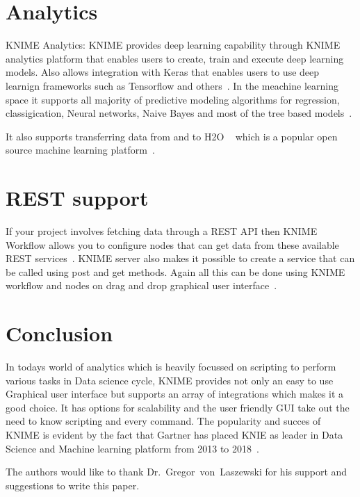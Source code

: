 \section{Analytics}
KNIME Analytics: KNIME provides deep learning capability through KNIME
analytics platform that enables users to create, train and execute
deep learning models. Also allows integration with Keras that enables
users to use deep learnign frameworks such as Tensorflow and
others~\cite{hid-sp18-517-dl}. In the meachine learning space it
supports all majority of predictive modeling algorithms for
regression, classigication, Neural networks, Naive Bayes and most of
the tree based models~\cite{hid-sp18-517-pml}.

It also supports transferring data from and to H2O
~\cite{hid-sp18-517-h20} which is a popular open source machine
learning platform~\cite{hid-sp18-517-knimeh20}.

\section{REST support}

If your project involves fetching data through a REST API then KNIME
Workflow allows you to configure nodes that can get data from these
available REST services~\cite{hid-sp18-517-knimeapi}.  KNIME server
also makes it possible to create a service that can be called using
post and get methods.  Again all this can be done using KNIME workflow
and nodes on drag and drop graphical user
interface~\cite{hid-sp18-517-knimerest}.


\section{Conclusion}

In todays world of analytics which is heavily focussed on scripting to
perform various tasks in Data science cycle, KNIME provides not only
an easy to use Graphical user interface but supports an array of
integrations which makes it a good choice. It has options for
scalability and the user friendly GUI take out the need to know
scripting and every command.  The popularity and succes of KNIME is
evident by the fact that Gartner has placed KNIE as leader in Data
Science and Machine learning platform from 2013 to
2018~\cite{hid-sp18-517-dsml}.

\begin{acks}

  The authors would like to thank Dr.~Gregor~von~Laszewski for his
  support and suggestions to write this paper.

\end{acks}


 



